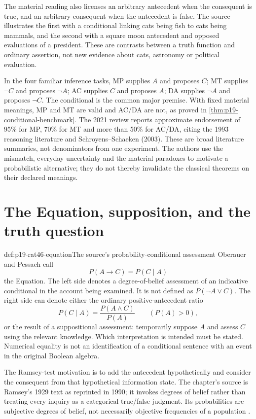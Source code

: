 The material reading also licenses an arbitrary antecedent when the
consequent is true, and an arbitrary consequent when the antecedent is
false. The source illustrates the first with a conditional linking cats
being fish to cats being mammals, and the second with a square moon
antecedent and opposed evaluations of a president. These are contrasts
between a truth function and ordinary assertion, not new evidence about
cats, astronomy or political evaluation.

In the four familiar inference tasks, MP supplies \(A\) and proposes
\(C\); MT supplies \(\neg C\) and proposes \(\neg A\); AC supplies
\(C\) and proposes \(A\); DA supplies \(\neg A\) and proposes
\(\neg C\). The conditional is the common major premise. With fixed
material meanings, MP and MT are valid and AC/DA are not, as proved in
\cref{thm:p19-conditional-benchmark}. The 2021 review reports approximate
endorsement of 95\% for MP, 70\% for MT and more than 50\% for AC/DA,
citing the 1993 reasoning literature and Schroyens--Schaeken (2003).
These are broad literature summaries, not denominators from one experiment.
The authors use the mismatch, everyday uncertainty and the material
paradoxes to motivate a probabilistic alternative; they do not thereby
invalidate the classical theorems on their declared meanings.

\section{The Equation, supposition, and the truth question}
\label{sec:p19-rat46-equation}

\begin{hbdefinition}{def:p19-rat46-equation}{The source's probability-conditional assessment}
Oberauer and Pessach call
\[
                         P(A\to C)=P(C\mid A)
\]
the Equation. The left side denotes a degree-of-belief assessment of
an indicative conditional in the account being examined. It is not
defined as \(P(\neg A\lor C)\). The right side can denote either
the ordinary positive-antecedent ratio
\[
                  P(C\mid A)=\frac{P(A\land C)}{P(A)}
                  \qquad(P(A)>0),
\]
or the result of a suppositional assessment: temporarily suppose \(A\)
and assess \(C\) using the relevant knowledge. Which interpretation
is intended must be stated. Numerical equality is not an identification
of a conditional sentence with an event in the original Boolean algebra.
\end{hbdefinition}

The Ramsey-test motivation is to add the antecedent hypothetically and
consider the consequent from that hypothetical information state. The
chapter's source is Ramsey's 1929 text as reprinted in 1990; it invokes
degrees of belief rather than treating every inquiry as a categorical
true/false judgment. Its probabilities are subjective degrees of belief,
not necessarily objective frequencies of a population
\cite[pp.~296--297]{OberauerPessach2021ProbabilitiesConditionals}.

